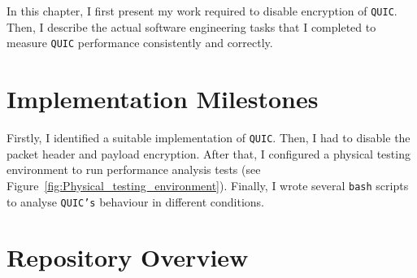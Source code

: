 \documentclass[12pt,a4paper,twoside,openright]{report}
\begin{document}





In this chapter, I first present my work required to disable encryption of \texttt{QUIC}.
Then, I describe the actual software engineering tasks that I completed to measure \texttt{QUIC} performance consistently and correctly.


\section{Implementation Milestones}
Firstly, I identified a suitable implementation of \texttt{QUIC}.
Then, I had to disable the packet header and payload encryption.
After that, I configured a physical testing environment to run performance analysis tests (see Figure~\ref{fig:Physical_testing_environment}).
Finally, I wrote several \texttt{bash} scripts to analyse \texttt{QUIC's} behaviour in different conditions. 

\section{Repository Overview} 
\end{document}
